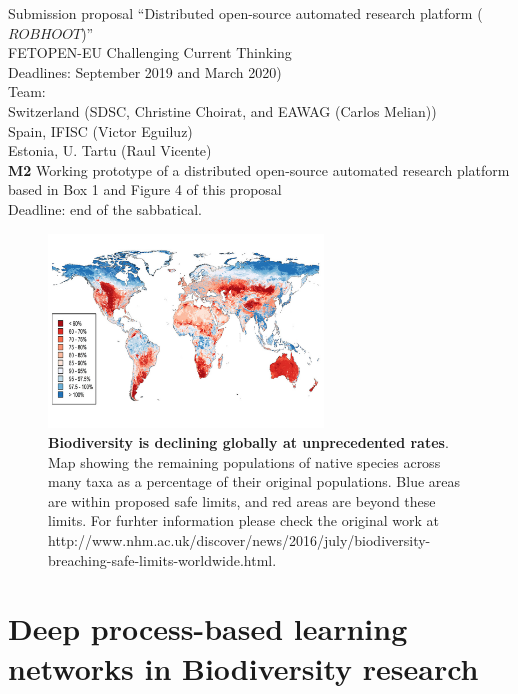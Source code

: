 \documentclass[authoryear,1p,12pt]{elsarticle}
\begin{document}
 Submission proposal ``Distributed open-source automated research platform ($ROBHOOT$)''\\
FETOPEN-EU Challenging Current Thinking\\
Deadlines: September 2019 and March 2020)\\
Team:\\
Switzerland (SDSC, Christine Choirat, and EAWAG (Carlos Melian))\\
Spain, IFISC (Victor Eguiluz)\\
Estonia, U. Tartu (Raul Vicente)\\
{\bf M2} Working prototype of a distributed open-source automated
research platform based in Box 1 and Figure 4 of this proposal\\
Deadline: end of the sabbatical.



\newpage

\begin{figure}
  \begin{center}
       \includegraphics[width=0.65\textwidth]{Figure1}
     \end{center}
     \vspace{-0.7 in}
     \caption{{\bf Biodiversity is declining globally at unprecedented
         rates}. Map showing the remaining populations of native
       species across many taxa as a percentage of their original
       populations. Blue areas are within proposed safe limits, and
       red areas are beyond these limits. For furhter information
       please check the original work at
       {http://www.nhm.ac.uk/discover/news/2016/july/biodiversity-breaching-safe-limits-worldwide.html}.}
\end{figure}


\pagebreak
\section{{\bf Deep process-based learning networks in Biodiversity research}}
\end{document}
